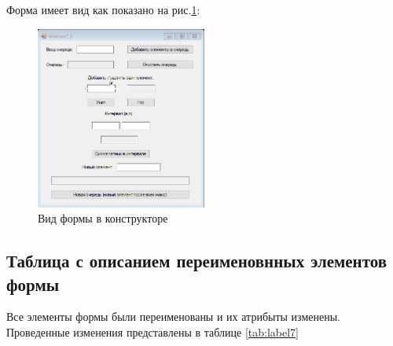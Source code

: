 Форма имеет вид как показано на рис.\ref{fig:FormInConstruct7}:

\newpage

\begin{figure}[!h]
    \centering
    \includegraphics[width = 0.5\textwidth]{images/Task7/FormInConstructor.png}
    \caption{Вид формы в конструкторе}
    \label{fig:FormInConstruct7}
\end{figure}

\subsection{Таблица с описанием переименовнных элементов формы}

Все элементы формы были переименованы и их атрибыты изменены. Проведенные изменения представлены в таблице \ref{tab:label7}

